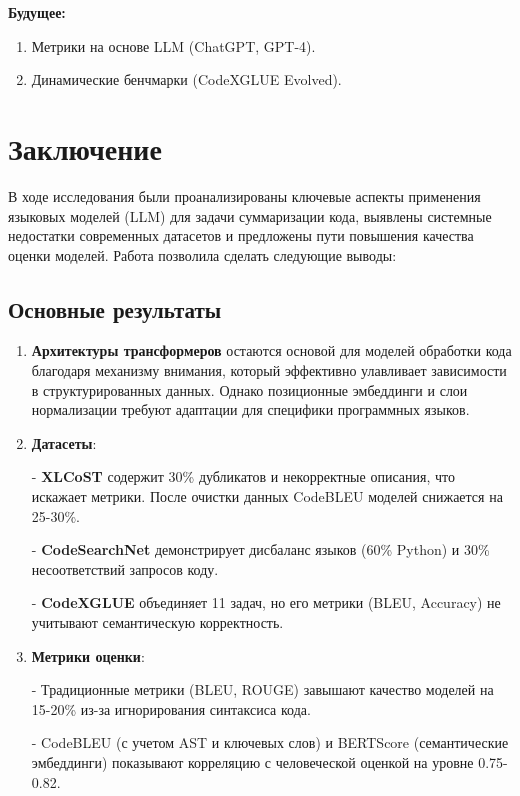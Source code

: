 \documentclass[14pt]{article}
\theoremstyle{definition}
\begin{document}
\textbf{Будущее:}
\begin{enumerate}
    \item Метрики на основе LLM (ChatGPT, GPT-4).
    \item Динамические бенчмарки (CodeXGLUE Evolved).
\end{enumerate}


\newpage
\section{Заключение}

В ходе исследования были проанализированы ключевые аспекты применения языковых моделей (LLM) для задачи суммаризации кода, выявлены системные недостатки современных датасетов и предложены пути повышения качества оценки моделей. Работа позволила сделать следующие выводы:

\subsection{Основные результаты}
\begin{enumerate}
    \item \textbf{Архитектуры трансформеров} остаются основой для моделей обработки кода благодаря механизму внимания, который эффективно улавливает зависимости в структурированных данных. Однако позиционные эмбеддинги и слои нормализации требуют адаптации для специфики программных языков.
    
    \item \textbf{Датасеты}:
    
        
- \textbf{XLCoST} содержит 30\% дубликатов и некорректные описания, что искажает метрики. После очистки данных CodeBLEU моделей снижается на 25-30\%.
        
- \textbf{CodeSearchNet} демонстрирует дисбаланс языков (60\% Python) и 30\% несоответствий запросов коду.
        
- \textbf{CodeXGLUE} объединяет 11 задач, но его метрики (BLEU, Accuracy) не учитывают семантическую корректность.
    
    
    \item \textbf{Метрики оценки}:
    
        
- Традиционные метрики (BLEU, ROUGE) завышают качество моделей на 15-20\% из-за игнорирования синтаксиса кода.
        
- CodeBLEU (с учетом AST и ключевых слов) и BERTScore (семантические эмбеддинги) показывают корреляцию с человеческой оценкой на уровне 0.75-0.82.
    
\end{enumerate}
\end{document}
